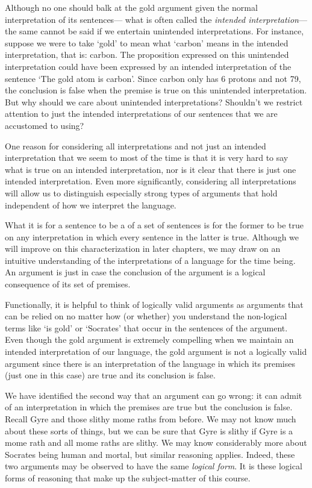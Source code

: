 Although no one should balk at the gold argument given the normal interpretation of its sentences--- what is often called the \textit{intended interpretation}--- the same cannot be said if we entertain unintended interpretations.
For instance, suppose we were to take `gold' to mean what `carbon' means in the intended interpretation, that is: carbon.
The proposition expressed on this unintended interpretation could have been expressed by an intended interpretation of the sentence `The gold atom is carbon'.
Since carbon only has 6 protons and not 79, the conclusion is false when the premise is true on this unintended interpretation.
But why should we care about unintended interpretations?
Shouldn't we restrict attention to just the intended interpretations of our sentences that we are accustomed to using?

One reason for considering all interpretations and not just an intended interpretation that we seem to most of the time is that it is very hard to say what is true on an intended interpretation, nor is it clear that there is just one intended interpretation.
Even more significantly, considering all interpretations will allow us to distinguish especially strong types of arguments that hold independent of how we interpret the language.

What it is for a sentence to be a  of a set of sentences is for the former to be true on any interpretation in which every sentence in the latter is true. 
Although we will improve on this characterization in later chapters, we may draw on an intuitive understanding of the interpretations of a language for the time being.
An argument is  just in case the conclusion of the argument is a logical consequence of its set of premises.

Functionally, it is helpful to think of logically valid arguments as arguments that can be relied on no matter how (or whether) you understand the non-logical terms like `is gold' or `Socrates' that occur in the sentences of the argument.
Even though the gold argument is extremely compelling when we maintain an intended interpretation of our language, the gold argument is not a logically valid argument since there is an interpretation of the language in which its premises (just one in this case) are true and its conclusion is false.

We have identified the second way that an argument can go wrong: it can admit of an interpretation in which the premises are true but the conclusion is false.
Recall Gyre and those slithy mome raths from before.
We may not know much about these sorts of things, but we can be sure that Gyre is slithy if Gyre is a mome rath and all mome raths are slithy.
We may know considerably more about Socrates being human and mortal, but similar reasoning applies.
Indeed, these two arguments may be observed to have the same \textit{logical form}.
It is these logical forms of reasoning that make up the subject-matter of this course.

